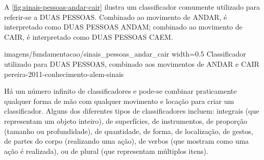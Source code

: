 \begin{enumerate}
    A \autoref{fig:sinais-pessoas-andar-cair} ilustra um classificador comumente utilizado para referir-se a DUAS PESSOAS. Combinado ao movimento de ANDAR, é interpretado como DUAS PESSOAS ANDAM; combinado ao movimento de CAIR, é interpretado como DUAS PESSOAS CAEM.

        {imagens/fundamentacao/sinais_pessoas_andar_cair} %
        {width=0.5\linewidth} %
        {Classificador utilizado para DUAS PESSOAS, combinado aos movimentos de ANDAR e CAIR} %
        {pereira-2011-conhecimento-alem-sinais} %

    Há um número infinito de classificadores e pode-se combinar praticamente qualquer forma de mão com qualquer movimento e locação para criar um classificador.
    Alguns dos diferentes tipos de classificadores incluem: integrais (que representam um objeto inteiro), de superfícies, de instrumentos, de proporção (tamanho ou profundidade), de quantidade, de forma, de localização, de gestos, de partes do corpo (realizando uma ação), de verbos (que mostram como uma ação é realizada), ou de plural (que representam múltiplos itens).



\end{enumerate}
